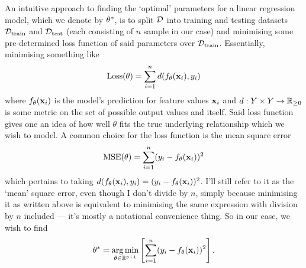 \documentclass[11pt]{article}
\begin{document}
An intuitive approach to finding the `optimal' parameters for a linear regression model, which we denote by $\theta^{*}$, is to split $\mathcal{D}$ into training and testing datasets $\mathcal{D}_{\text{train}}$ and $\mathcal{D}_{\text{test}}$ (each consisting of $n$ sample in our case) and minimising some pre-determined loss function of said parameters over $\mathcal{D}_{\text{train}}$. Essentially, minimising something like
$$
\text{Loss}(\theta)=\sum_{i=1}^nd(f_{\theta}(\mathbf{x}_i), y_i)
$$
where $f_{\theta}(\mathbf{x}_i)$ is the model's prediction for feature values $\mathbf{x}_i$ and $d:Y\times Y\rightarrow\mathbb{R}_{\geq0}$ is some metric on the set of possible output values and itself. Said loss function gives one an idea of how well $\theta$ fits the true underlying relationship which we wish to model. A common choice for the loss function is the mean square error
$$
\text{MSE}(\theta)=\sum_{i=1}^n(y_i-f_{\theta}(\mathbf{x}_i))^2
$$
which pertains to taking $d(f_{\theta}(\mathbf{x}_i), y_i)=(y_i-f_{\theta}(\mathbf{x}_i))^2$. I'll still refer to it as the `mean' square error, even though I don't divide by $n$, simply because minimising it as written above is equivalent to minimising the same expression with division by $n$ included — it's mostly a notational convenience thing. So in our case, we wish to find
$$
\theta^{*}=\operatorname*{arg\,min}_{\theta\in\mathbb{R}^{p+1}}\left[\sum_{i=1}^n(y_i-f_{\theta}(\mathbf{x}_i))^2\right].
$$
\end{document}
